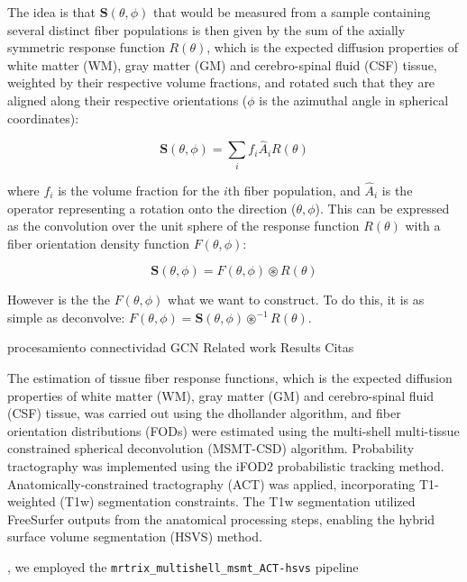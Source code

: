 \documentclass{cys}
\begin{document}
\bigskip
The idea is that $\mathbf{S}(\theta,\phi)$  that would be measured from a sample containing several distinct fiber populations is then given by the
sum of the axially symmetric response function $R(\theta)$, which is the expected diffusion properties of white matter (WM), gray matter (GM) and cerebro-spinal fluid (CSF) tissue, weighted by their respective volume fractions, and rotated such that they are aligned along their respective orientations ($\phi$ is the azimuthal angle in spherical coordinates):

\begin{equation}
\mathbf{S}(\theta,\phi)=\sum_i f_i \hat{A}_iR(\theta)
\end{equation}

where $f_i$ is the volume fraction for the $i$th fiber population, and $\hat{A}_i$ is the operator representing a rotation onto the direction ($\theta,\phi$). This can be expressed as the convolution over the unit sphere of the response function $R(\theta)$ with a fiber orientation density function $F(\theta,\phi)$:

\begin{equation}
\mathbf{S}(\theta,\phi)= F(\theta,\phi)\circledast R(\theta)
\end{equation} 

However is the the $F(\theta,\phi)$ what we want to construct. To do this, it is as simple as deconvolve: $F(\theta,\phi)= \mathbf{S}(\theta,\phi) \circledast^{-1} R(\theta)$.   

procesamiento connectividad
GCN
Related work
Results 
Citas

The estimation of tissue fiber response functions, which is the expected diffusion properties of white matter (WM), gray matter (GM) and cerebro-spinal fluid (CSF) tissue, was carried out using the dhollander algorithm, and fiber orientation distributions (FODs) were estimated using the multi-shell multi-tissue constrained spherical deconvolution (MSMT-CSD) algorithm. Probability tractography was implemented using the iFOD2 probabilistic tracking method. Anatomically-constrained tractography (ACT) was applied, incorporating T1-weighted (T1w) segmentation constraints. The T1w segmentation utilized FreeSurfer outputs from the anatomical processing steps, enabling the hybrid surface 
volume segmentation (HSVS) method.

, we employed the \texttt{mrtrix\_multishell\_msmt\_ACT-hsvs} pipeline
\end{document}
